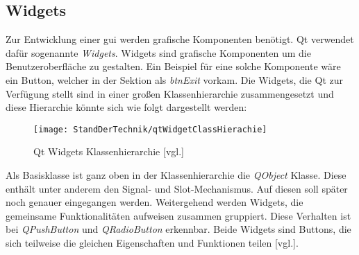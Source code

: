 \subsection{Widgets}
\label{subsec:widgets}
Zur Entwicklung einer \ac{gui} werden grafische Komponenten benötigt. Qt verwendet dafür sogenannte \emph{Widgets}. Widgets sind grafische
Komponenten um die Benutzeroberfläche zu gestalten. Ein Beispiel für eine solche Komponente wäre ein Button, welcher in der Sektion
\emph{} als \emph{btnExit} vorkam.
\newline
\newline
Die Widgets, die Qt zur Verfügung stellt sind in einer großen Klassenhierarchie zusammengesetzt
und diese Hierarchie könnte sich wie folgt dargestellt werden:
\newpage
\begin{figure}[h]
    \centering
    \texttt{[image: StandDerTechnik/qtWidgetClassHierachie]}
    \caption[Qt Widgets Klassenhierachie]{Qt Widgets Klassenhierarchie
    \cite{GettingStartedQt}[vgl.]}
    \label{img:qtWidgetClassHierachie}
\end{figure}

Als Basisklasse ist ganz oben in der Klassenhierarchie die \emph{QObject} Klasse. Diese
enthält unter anderem den Signal- und Slot-Mechanismus. Auf diesen soll später noch genauer
eingegangen werden.
Weitergehend werden Widgets, die gemeinsame Funktionalitäten aufweisen zusammen gruppiert. Diese
Verhalten ist bei \emph{QPushButton} und \emph{QRadioButton} erkennbar. Beide Widgets sind
Buttons, die sich teilweise die gleichen Eigenschaften und Funktionen teilen
\cite{GettingStartedQt}[vgl.].
